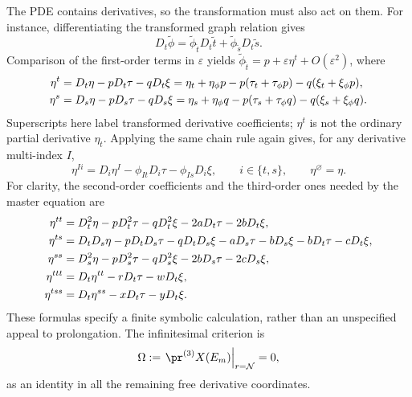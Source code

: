 The PDE contains derivatives, so the transformation must also act on them.
For instance, differentiating the transformed graph relation gives
\[
 D_t\widetilde\phi
   =\widetilde\phi_{\widetilde t}D_t\widetilde t
       +\widetilde\phi_{\widetilde s}D_t\widetilde s.
\]
Comparison of the first-order terms in $\varepsilon$ yields
$\widetilde\phi_{\widetilde t}=p+\varepsilon\eta^t+O(\varepsilon^2)$,
where
\begin{align}
 \eta^t&=D_t\eta-pD_t\tau-qD_t\xi
       =\eta_t+\eta_\phi p-p(\tau_t+\tau_\phi p)
                              -q(\xi_t+\xi_\phi p),\notag\\
 \eta^s&=D_s\eta-pD_s\tau-qD_s\xi
       =\eta_s+\eta_\phi q-p(\tau_s+\tau_\phi q)
                              -q(\xi_s+\xi_\phi q).
 \label{eq:sve-first-prolongation}
\end{align}
Superscripts here label transformed derivative coefficients; $\eta^t$ is
not the ordinary partial derivative $\eta_t$. Applying the same chain rule
again gives, for any derivative multi-index $I$,
\begin{equation}
 \eta^{Ii}=D_i\eta^I-\phi_{It}D_i\tau-\phi_{Is}D_i\xi,
 \qquad i\in\{t,s\},\qquad \eta^\varnothing=\eta.
 \label{eq:sve-prolongation-recursion}
\end{equation}
For clarity, the second-order coefficients and the third-order ones needed
by the master equation are
\begin{align}
 \eta^{tt}&=D_t^2\eta-pD_t^2\tau-qD_t^2\xi
                          -2aD_t\tau-2bD_t\xi,\notag\\
 \eta^{ts}&=D_tD_s\eta-pD_tD_s\tau-qD_tD_s\xi
                    -aD_s\tau-bD_s\xi-bD_t\tau-cD_t\xi,\notag\\
 \eta^{ss}&=D_s^2\eta-pD_s^2\tau-qD_s^2\xi
                          -2bD_s\tau-2cD_s\xi,\notag\\
 \eta^{ttt}&=D_t\eta^{tt}-rD_t\tau-wD_t\xi,\notag\\
 \eta^{tss}&=D_t\eta^{ss}-xD_t\tau-yD_t\xi.
 \label{eq:sve-higher-prolongation}
\end{align}
These formulas specify a finite symbolic calculation, rather than an
unspecified appeal to prolongation. The infinitesimal criterion
\cite{olver,oliveri2026} is
\begin{equation}
 \Omega:=\left.\pr^{(3)}X(E_m)\right|_{r=\mathcal N}=0,
 \label{eq:sve-omega}
\end{equation}
as an identity in all the remaining free derivative coordinates.

